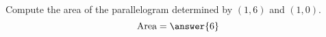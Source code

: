 \begin{problem}
Compute the area of the parallelogram determined by $(1,6)$ and $(1,0)$.
\[
\textrm{Area} = \answer{6}
\]
\end{problem}